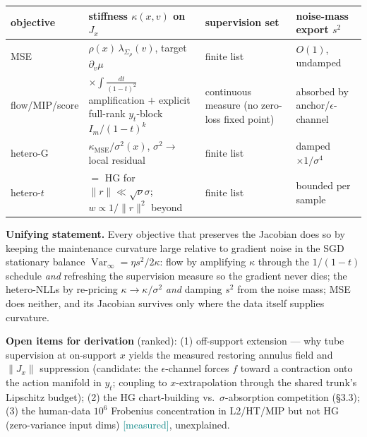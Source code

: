 \documentclass[10pt]{article}
\newcommand{\tagm}{{\small\textcolor{teal}{[measured]}}}
\begin{document}
\begin{center}
\renewcommand{\arraystretch}{1.6}
\small
\begin{tabular}{p{2.4cm}p{5.6cm}p{3.2cm}p{3.2cm}}
\toprule
objective & stiffness $\kappa(x,v)$ on $J_x$ & supervision set & noise-mass
export $s^{2}$ \\
\midrule
MSE & $\rho(x)\,\lambda_{\Sigma_\rho}(v)$, target $\partial_v\mu$ &
finite list & $O(1)$, undamped \\
flow/MIP/score & $\times\!\int\!\frac{dt}{(1-t)^{2}}$ amplification $+$
explicit full-rank $y_t$-block $I_m/(1-t)^{k}$ & continuous measure (no
zero-loss fixed point) & absorbed by anchor/$\epsilon$-channel \\
hetero-G & $\kappa_{\mathrm{MSE}}/\sigma^{2}(x)$, $\sigma^{2}\!\to$ local
residual & finite list & damped $\times 1/\sigma^{4}$ \\
hetero-$t$ & $=$ HG for $\|r\|\ll\sqrt{\nu}\sigma$; $w\propto 1/\|r\|^{2}$
beyond & finite list & bounded per sample \\
\bottomrule
\end{tabular}
\end{center}

\textbf{Unifying statement.} Every objective that preserves the Jacobian does
so by keeping the maintenance curvature large relative to gradient noise in
the SGD stationary balance $\operatorname{Var}_\infty = \eta s^{2}/2\kappa$:
flow by amplifying $\kappa$ through the $1/(1-t)$ schedule \emph{and}
refreshing the supervision measure so the gradient never dies; the
hetero-NLLs by re-pricing $\kappa \to \kappa/\sigma^{2}$ \emph{and} damping
$s^{2}$ from the noise mass; MSE does neither, and its Jacobian survives only
where the data itself supplies curvature.

\textbf{Open items for derivation} (ranked): (1) off-support extension ---
why tube supervision at on-support $x$ yields the measured restoring annulus
field and $\|J_x\|$ suppression (candidate: the $\epsilon$-channel forces $f$
toward a contraction onto the action manifold in $y_t$; coupling to
$x$-extrapolation through the shared trunk's Lipschitz budget); (2) the HG
chart-building vs.\ $\sigma$-absorption competition (\S3.3); (3) the
human-data $10^{6}$ Frobenius concentration in L2/HT/MIP but not HG
(zero-variance input dims) \tagm, unexplained.
\end{document}
